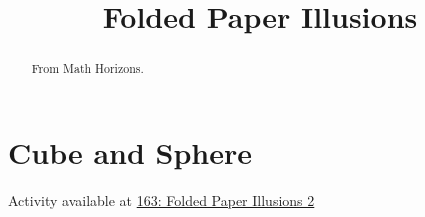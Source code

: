 \documentclass{ximera}
\title{Folded Paper Illusions}
\begin{document}
\begin{abstract}
From Math Horizons.
\end{abstract}
\maketitle


 
\begin{onlineOnly}
    \begin{center}
\end{center}
\end{onlineOnly}





\section*{Cube and Sphere}


\begin{onlineOnly}
    \begin{center}
\end{center}
\end{onlineOnly}

 

Activity available at  \href{https://www.desmos.com/3d/a562c21711}{163: Folded Paper Illusions 2}
\end{document}
